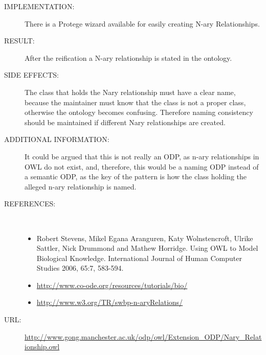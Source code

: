\begin{description}
\item [IMPLEMENTATION:] There is a Protege wizard available for easily creating N-ary Relationships.

\item [RESULT:] After the reification a N-ary relationship is stated in the ontology.

\item [SIDE EFFECTS:] The class that holds the Nary relationship must have a clear name, because the maintainer must know that the class is not a proper class, otherwise the ontology becomes confusing. Therefore naming consistency should be maintained if different Nary relationships are created.

\item [ADDITIONAL INFORMATION:] It could be argued that this is not really an ODP, as n-ary relationships in OWL do not exist, and, therefore, this would be a naming ODP instead of a semantic ODP, as the key of the pattern is how the class holding the alleged n-ary relationship is named.

\item [REFERENCES: ] ~\begin{itemize}
\item Robert Stevens, Mikel Egana Aranguren, Katy Wolnstencroft, Ulrike Sattler, Nick Drummond and Mathew Horridge. Using OWL to Model Biological Knowledge. International Journal of Human Computer Studies 2006, 65:7, 583-594.
\item \url{http://www.co-ode.org/resources/tutorials/bio/}
\item \url{http://www.w3.org/TR/swbp-n-aryRelations/}\end{itemize}
\item [URL: ] \url{http://www.gong.manchester.ac.uk/odp/owl/Extension_ODP/Nary_Relationship.owl} \end{description}